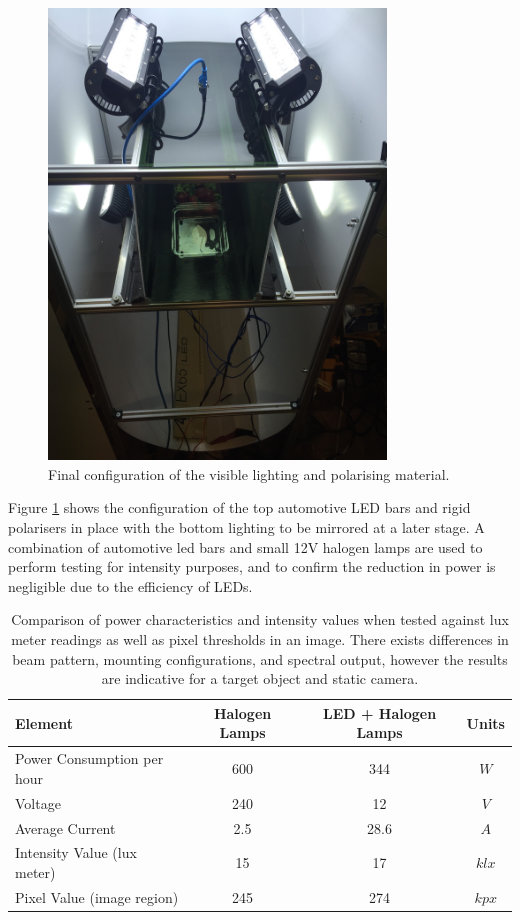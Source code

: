 \documentclass[fleqn,twoside,12pt]{report}
\begin{document}
\begin{figure}[h!]
	\centering
	\includegraphics[width=0.8\textwidth,angle=270]{bench_led_rigid.jpg}
	\caption{Final configuration of the visible lighting and polarising material.}
	\label{fig:final_led}
\end{figure} 

Figure \ref{fig:final_led} shows the configuration of the top automotive LED bars and rigid polarisers in place with the bottom lighting to be mirrored at a later stage. A combination of automotive led bars and small 12V halogen lamps are used to perform testing for intensity purposes, and to confirm the reduction in power is negligible due to the efficiency of LEDs. 



\begin{table}[h]
	\centering
	\caption{Comparison of power characteristics and intensity values when tested against lux meter readings as well as pixel thresholds in an image. There exists differences in beam pattern, mounting configurations, and spectral output, however the results are indicative for a target object and static camera.}
	\label{tab:AC_vs_DC}
	\begin{tabular}{lccc}
		\toprule
		Element & Halogen Lamps & LED + Halogen Lamps & Units \\
		\midrule
		Power Consumption per hour 	& 600 		& 344 		& $W$ \\
		Voltage						& 240  		& 12  		& $V$ \\
		Average Current				& 2.5		& 28.6		& $A$  \\
		Intensity Value (lux meter)	& 15		& 17		& $klx$  \\
		Pixel Value	(image region)	& 245		& 274		& $kpx$  \\
		\bottomrule
	\end{tabular}
\end{table} 
\end{document}

